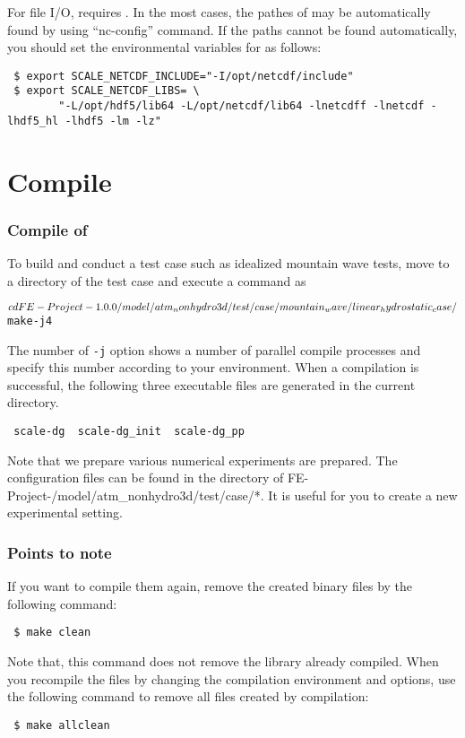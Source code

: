 For file I/O, \scaledg requires \netcdf.
In the most cases, the pathes of \netcdf may be automatically found by using ``nc-config'' command.
If the paths cannot be found automatically, 
you should set the environmental variables for \netcdf as follows:
\begin{verbatim}
 $ export SCALE_NETCDF_INCLUDE="-I/opt/netcdf/include"
 $ export SCALE_NETCDF_LIBS= \
        "-L/opt/hdf5/lib64 -L/opt/netcdf/lib64 -lnetcdff -lnetcdf -lhdf5_hl -lhdf5 -lm -lz"
\end{verbatim}


\section{Compile} \label{sec:compile}

\subsubsection{Compile of \scaledg}

To build \scaledg and conduct a test case such as idealized mountain wave tests, 
move to a directory of the test case and execute a command as 
\begin{alltt}
 $ cd FE-Project-{\version}/model/atm_nonhydro3d/test/case/mountain_wave/linear_hydrostatic_case/
 $ make -j 4
\end{alltt}
The number of \verb|-j| option shows a number of parallel compile processes 
and specify this number according to your environment.
When a compilation is successful, 
the following three executable files are generated in the current directory.
\begin{verbatim}
 scale-dg  scale-dg_init  scale-dg_pp
\end{verbatim}

Note that we prepare various numerical experiments are prepared. 
The configuration files can be found in the directory of 
FE-Project-{\version}/model/atm\_nonhydro3d/test/case/*. 
It is useful for you to create a new experimental setting.

\subsubsection{Points to note}

\noindent If you want to compile them again, remove the created binary files by the following command:
\begin{verbatim}
 $ make clean
\end{verbatim}
Note that, this command does not remove the library already compiled.
When you recompile the files by changing the compilation environment and options, 
use the following command to remove all files created by compilation:
\begin{verbatim}
 $ make allclean
\end{verbatim}


